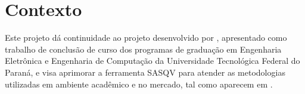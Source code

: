 \chapter{Contexto}

Este projeto dá continuidade ao projeto desenvolvido por \cite{sasqv}, apresentado como trabalho de conclusão de curso dos programas de graduação em Engenharia Eletrônica e Engenharia de Computação da Universidade Tecnológica Federal do Paraná, e visa aprimorar a ferramenta SASQV para atender as metodologias utilizadas em ambiente acadêmico e no mercado, tal como aparecem em \cite{albini, vqeg}.
